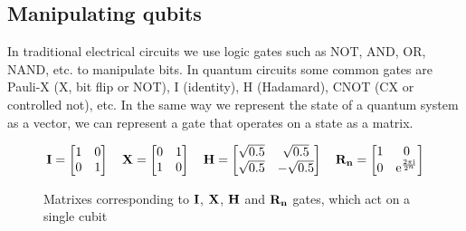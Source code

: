 \subsection{Manipulating qubits}\label{sec:maniq}
\noindent
In traditional electrical circuits we use logic gates such as NOT, AND, OR, NAND, etc. to manipulate bits. In quantum circuits some common gates are Pauli-X (X, bit flip or NOT), I (identity), H (Hadamard), CNOT (CX or controlled not), etc. In the same way we represent the state of a quantum system as a vector, we can represent a gate that operates on a state as a matrix. 
\newcommand{\qi}{\begin{bmatrix}
        1 & 0\\
        0 & 1\\
    \end{bmatrix}}
\newcommand{\qre}[1]{\mathrm{e}^{\frac{2\pi \mathrm{i}}{2^{#1}}}}
\newcommand{\qr}[1]{\begin{bmatrix}
        1 & 0\\
        0 & \qre{#1}\\
    \end{bmatrix}}
\newcommand{\qx}{\begin{bmatrix}
        0 & 1\\
        1 & 0\\
    \end{bmatrix}}
\newcommand{\qh}{\begin{bmatrix}
        \sqrt{0.5} & \sqrt{0.5}\\
        \sqrt{0.5} & -\sqrt{0.5}\\
    \end{bmatrix}}
\newcommand{\qcx}{\begin{bmatrix}
        1 & 0 & 0 & 0\\
        0 & 1 & 0 & 0\\
        0 & 0 & 0 & 1\\
        0 & 0 & 1 & 0\\
    \end{bmatrix}}
    

\begin{figure}[H]
    \centering
    \begin{align*}
        \qti = \qi\quad
        \qtx = \qx\quad
        \qth = \qh\quad
        \qtr{n} = \qr{n}
    \end{align*}
    \caption{Matrixes corresponding to $\mathbf{I}$, $\mathbf{X}$, $\mathbf{H}$ and $\mathbf{R_{n}}$ gates, which act on a single cubit}
    \label{fig:single_qubit_gates}
\end{figure}

